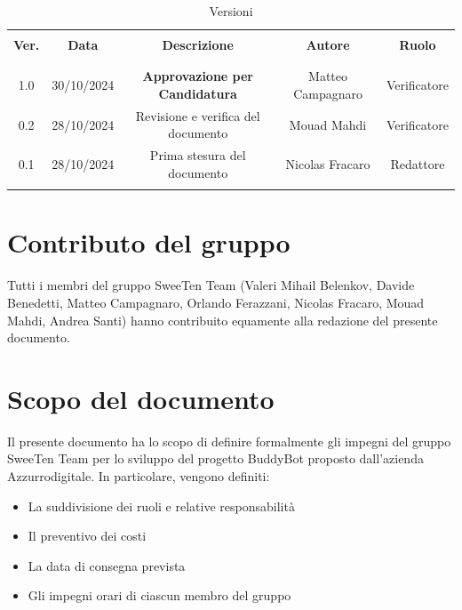 \documentclass[italian, 12pt]{article}
\begin{document}
\pagestyle{mystyle}


\begin{table}[!h]
	\caption{Versioni}
	\begin{center}
		\begin{tabular}{ c c c c c}
			\hline \\[-2ex]
			\textbf{Ver.} & \textbf{Data} & \textbf{Descrizione} & \textbf{Autore} & \textbf{Ruolo}  \\
			\\[-2ex] \hline \\[-1.5ex]
            1.0 & 30/10/2024 & \textbf{Approvazione per Candidatura} & Matteo Campagnaro & Verificatore\\
			0.2 & 28/10/2024 & Revisione e verifica del documento & Mouad Mahdi & Verificatore\\
			0.1 & 28/10/2024 & Prima stesura del documento & Nicolas Fracaro & Redattore\\
			\\[-1.5ex] \hline
		\end{tabular}
	\end{center}
\end{table}
\section*{Contributo del gruppo}
\noindent Tutti i membri del gruppo SweeTen Team (Valeri Mihail Belenkov, Davide Benedetti, Matteo Campagnaro, Orlando Ferazzani, Nicolas Fracaro, Mouad Mahdi, Andrea Santi) hanno contribuito equamente alla redazione del presente documento.
\newpage

\tableofcontents
\newpage


\section{Scopo del documento}
Il presente documento ha lo scopo di definire formalmente gli impegni del gruppo SweeTen Team per lo sviluppo del progetto BuddyBot proposto dall'azienda Azzurrodigitale. In particolare, vengono definiti:
\begin{itemize}
    \item La suddivisione dei ruoli e relative responsabilità
    \item Il preventivo dei costi
    \item La data di consegna prevista
    \item Gli impegni orari di ciascun membro del gruppo
\end{itemize}
\end{document}
